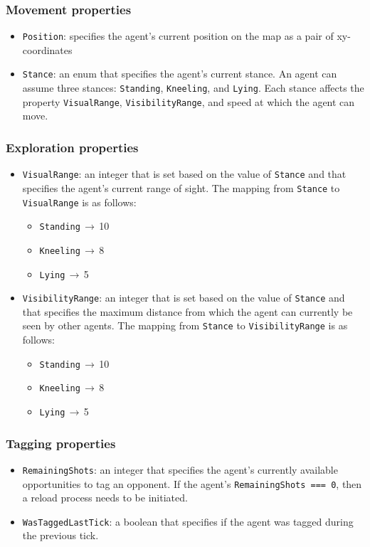 \documentclass[
    a4paper,
    english,
    DIV=16,
    11pt,
    parskip=half,
    listof=totoc,		%
    index=totoc,		%
    bibliography=totoc,	%
]{scrartcl}
\begin{document}
\subsubsection{Movement properties} \label{movAttr}
\begin{itemize}
    \item \texttt{Position}: specifies the agent's current position on the map as a pair of xy-coordinates
    \item \texttt{Stance}: an enum that specifies the agent's current stance. An agent can assume three stances: \texttt{Standing}, \texttt{Kneeling}, and \texttt{Lying}. Each stance affects the property \texttt{VisualRange}, \texttt{VisibilityRange}, and speed at which the agent can move.
\end{itemize}

\subsubsection{Exploration properties} \label{explAttr}
\begin{itemize}
    \item \texttt{VisualRange}: an integer that is set based on the value of \texttt{Stance} and that specifies the agent's current range of sight. The mapping from \texttt{Stance} to \texttt{VisualRange} is as follows:
    \begin{itemize}
        \item \texttt{Standing}$\,\to\,$10
        \item \texttt{Kneeling}$\,\to\,$8
        \item \texttt{Lying}$\,\to\,$5
    \end{itemize}
    \item \texttt{VisibilityRange}: an integer that is set based on the value of \texttt{Stance} and that specifies the maximum distance from which the agent can currently be seen by other agents. The mapping from \texttt{Stance} to \texttt{VisibilityRange} is as follows:
    \begin{itemize}
        \item \texttt{Standing}$\,\to\,$10
        \item \texttt{Kneeling}$\,\to\,$8
        \item \texttt{Lying}$\,\to\,$5
    \end{itemize}
\end{itemize}

\subsubsection{Tagging properties}
\begin{itemize}
    \item \texttt{RemainingShots}: an integer that specifies the agent's currently available opportunities to tag an opponent. If the agent's \texttt{RemainingShots === 0}, then a reload process needs to be initiated.
    \item \texttt{WasTaggedLastTick}: a boolean that specifies if the agent was tagged during the previous tick.
\end{itemize}
\end{document}
